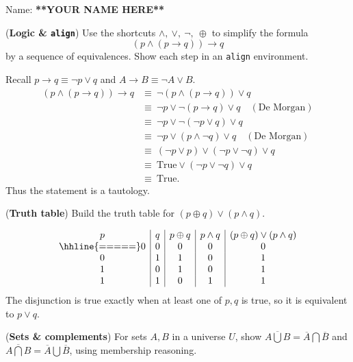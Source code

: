 \documentclass[solutions,answers]{exam}
\providecommand{\land}{\ensuremath{\wedge}}
\providecommand{\lor}{\ensuremath{\vee}}
\providecommand{\lxor}{\ensuremath{\oplus}}
\providecommand{\intersect}{\ensuremath{\bigcap}}
\providecommand{\union}{\ensuremath{\bigcup}}
\begin{document}
\vspace*{1em}
\noindent Name: \textbf{**YOUR NAME HERE**} \setlength\answerclearance{0.7ex}

\begin{questions}

\question[4]
(\textbf{Logic \& \texttt{align}}) Use the shortcuts $\land,\ \lor,\ \lnot,\ \lxor$ to simplify the formula
\[
(p \land (p \to q)) \to q
\]
by a sequence of equivalences. Show each step in an \texttt{align} environment.

\begin{solution}
Recall $p\to q \equiv \lnot p \lor q$ and $A\to B \equiv \lnot A \lor B$.
\begin{align}
(p \land (p \to q)) \to q
&\equiv \ \lnot(p \land (p \to q)) \lor q \\
&\equiv \ \lnot p \lor \lnot(p \to q) \lor q \quad (\text{De Morgan})\\
&\equiv \ \lnot p \lor \lnot(\lnot p \lor q) \lor q \\
&\equiv \ \lnot p \lor (p \land \lnot q) \lor q \quad (\text{De Morgan})\\
&\equiv \ (\lnot p \lor p) \lor (\lnot p \lor \lnot q) \lor q \\
&\equiv \ \text{True} \lor (\lnot p \lor \lnot q) \lor q \\
&\equiv \ \text{True}.
\end{align}
Thus the statement is a tautology.
\end{solution}

\question[4]
(\textbf{Truth table}) Build the truth table for $(p \lxor q) \lor (p \land q)$.

\begin{solution}
\[
\begin{array}{c|c|c|c|c}
p & q & p\lxor q & p\land q & (p \lxor q)\lor(p\land q)\\
\hhline{=====}
0 & 0 & 0 & 0 & 0\\
0 & 1 & 1 & 0 & 1\\
1 & 0 & 1 & 0 & 1\\
1 & 1 & 0 & 1 & 1\\
\end{array}
\]
The disjunction is true exactly when at least one of $p,q$ is true, so it is equivalent to $p\lor q$.
\end{solution}

\question[4]
(\textbf{Sets \& complements}) For sets $A,B$ in a universe $U$, show $\overline{A\union B}=\overline{A}\intersect\overline{B}$ and $\overline{A\intersect B}=\overline{A}\union\overline{B}$, using membership reasoning.


\end{questions}
\end{document}
